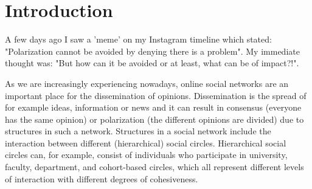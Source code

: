 \section{Introduction} \label{sec:intro}






A few days ago I saw a 'meme' on my Instagram timeline which stated: "Polarization cannot be avoided by denying there is a problem". My immediate thought was: "But how can it be avoided or at least, what can be of impact?!".

As we are increasingly experiencing nowadays, online social networks are an important place for the dissemination of opinions. Dissemination is the spread of for example ideas, information or news and it can result in consensus (everyone has the same opinion) or polarization (the different opinions are divided) due to structures in such a network. Structures in a social network include the interaction between different (hierarchical) social circles. Hierarchical social circles can, for example, consist of individuals who participate in university, faculty, department, and cohort-based circles, which all represent different levels of interaction with different degrees of cohesiveness.


